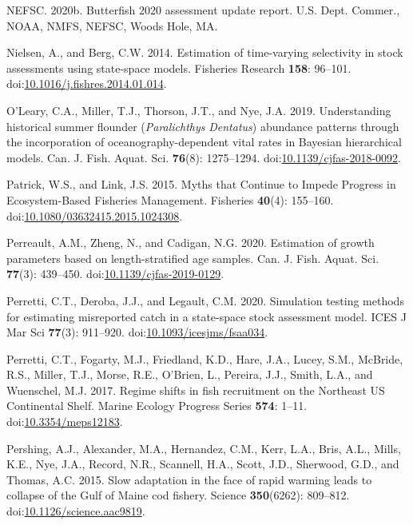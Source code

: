 \documentclass[]{article}
\begin{document}
\leavevmode\hypertarget{ref-nefsc2020Butterfish}{}%
NEFSC. 2020b. Butterfish 2020 assessment update report. U.S. Dept.
Commer., NOAA, NMFS, NEFSC, Woods Hole, MA.

\leavevmode\hypertarget{ref-nielsen2014Estimation}{}%
Nielsen, A., and Berg, C.W. 2014. Estimation of time-varying selectivity
in stock assessments using state-space models. Fisheries Research
\textbf{158}: 96--101.
doi:\href{https://doi.org/10.1016/j.fishres.2014.01.014}{10.1016/j.fishres.2014.01.014}.

\leavevmode\hypertarget{ref-oleary2019Understanding}{}%
O'Leary, C.A., Miller, T.J., Thorson, J.T., and Nye, J.A. 2019.
Understanding historical summer flounder (\emph{Paralichthys}
\emph{Dentatus}) abundance patterns through the incorporation of
oceanography-dependent vital rates in Bayesian hierarchical models. Can.
J. Fish. Aquat. Sci. \textbf{76}(8): 1275--1294.
doi:\href{https://doi.org/10.1139/cjfas-2018-0092}{10.1139/cjfas-2018-0092}.

\leavevmode\hypertarget{ref-patrick2015Myths}{}%
Patrick, W.S., and Link, J.S. 2015. Myths that Continue to Impede
Progress in Ecosystem-Based Fisheries Management. Fisheries
\textbf{40}(4): 155--160.
doi:\href{https://doi.org/10.1080/03632415.2015.1024308}{10.1080/03632415.2015.1024308}.

\leavevmode\hypertarget{ref-perreault2020Estimation}{}%
Perreault, A.M., Zheng, N., and Cadigan, N.G. 2020. Estimation of growth
parameters based on length-stratified age samples. Can. J. Fish. Aquat.
Sci. \textbf{77}(3): 439--450.
doi:\href{https://doi.org/10.1139/cjfas-2019-0129}{10.1139/cjfas-2019-0129}.

\leavevmode\hypertarget{ref-perretti2020Simulation}{}%
Perretti, C.T., Deroba, J.J., and Legault, C.M. 2020. Simulation testing
methods for estimating misreported catch in a state-space stock
assessment model. ICES J Mar Sci \textbf{77}(3): 911--920.
doi:\href{https://doi.org/10.1093/icesjms/fsaa034}{10.1093/icesjms/fsaa034}.

\leavevmode\hypertarget{ref-perretti2017Regime}{}%
Perretti, C.T., Fogarty, M.J., Friedland, K.D., Hare, J.A., Lucey, S.M.,
McBride, R.S., Miller, T.J., Morse, R.E., O'Brien, L., Pereira, J.J.,
Smith, L.A., and Wuenschel, M.J. 2017. Regime shifts in fish recruitment
on the Northeast US Continental Shelf. Marine Ecology Progress Series
\textbf{574}: 1--11.
doi:\href{https://doi.org/10.3354/meps12183}{10.3354/meps12183}.

\leavevmode\hypertarget{ref-pershing2015Slow}{}%
Pershing, A.J., Alexander, M.A., Hernandez, C.M., Kerr, L.A., Bris,
A.L., Mills, K.E., Nye, J.A., Record, N.R., Scannell, H.A., Scott, J.D.,
Sherwood, G.D., and Thomas, A.C. 2015. Slow adaptation in the face of
rapid warming leads to collapse of the Gulf of Maine cod fishery.
Science \textbf{350}(6262): 809--812.
doi:\href{https://doi.org/10.1126/science.aac9819}{10.1126/science.aac9819}.
\end{document}
